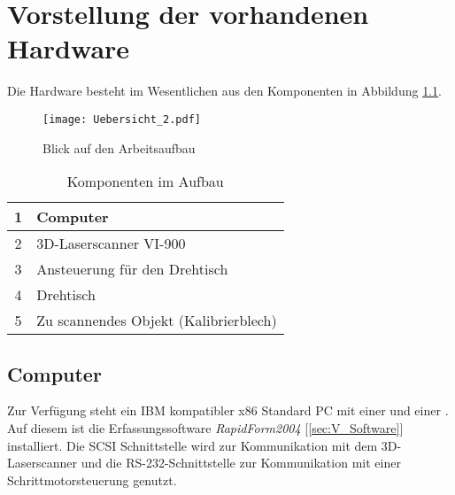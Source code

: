 \chapter{Vorstellung der vorhandenen Hardware}
\label{sec:Hardware}
Die Hardware besteht im Wesentlichen aus den Komponenten in Abbildung \ref{fig:Übersicht}.
\begin{figure}[htb]
\centering
\texttt{[image: Uebersicht\_2.pdf]}
\caption{Blick auf den Arbeitsaufbau}
\label{fig:Übersicht}
\end{figure}
\begin{table}[htb]
\caption{Komponenten im Aufbau}
\begin{tabular}{|c|l|}	\hline 
\rule[-1ex]{0pt}{2.5ex} 1 & 
Computer\\ \hline 
\rule[-1ex]{0pt}{2.5ex} 2 & 
3D-Laserscanner VI-900\\ \hline 
\rule[-1ex]{0pt}{2.5ex} 3 & 
Ansteuerung für den Drehtisch\\ \hline 
\rule[-1ex]{0pt}{2.5ex} 4 & 
Drehtisch\\ \hline 
\rule[-1ex]{0pt}{2.5ex} 5 & 
Zu scannendes Objekt (Kalibrierblech)\\ \hline 
\end{tabular} 
\label{tbl:Aufbau}
\end{table}
\section{Computer}
\label{sec:Computer}
Zur Verfügung steht ein IBM kompatibler x86 Standard PC mit einer  und einer . Auf diesem ist die Erfassungssoftware \emph{RapidForm2004} [\ref{sec:V_Software}] installiert. Die SCSI Schnittstelle wird zur Kommunikation mit dem 3D-Laserscanner und die RS-232-Schnittstelle zur Kommunikation mit einer Schrittmotorsteuerung genutzt.
